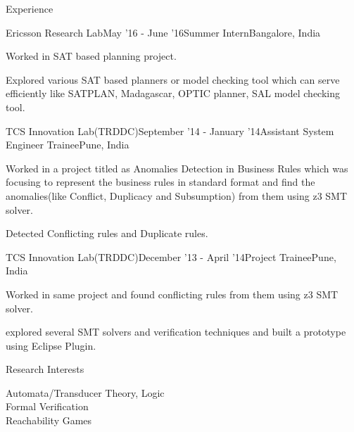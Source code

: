 \documentclass{resume} %
\begin{document}
\begin{rSection}{Experience}

\begin{rSubsection}{Ericsson Research Lab}{May '16 - June '16}{Summer Intern}{Bangalore, India}
\item Worked in SAT based planning project.
\item Explored various SAT based planners or model checking tool which can serve efficiently like SATPLAN, Madagascar, OPTIC planner, SAL model checking tool.
\end{rSubsection}

\begin{rSubsection}{TCS Innovation Lab(TRDDC)}{September '14 - January '14}{Assistant System Engineer Trainee}{Pune, India}
\item Worked in a project titled as Anomalies Detection in Business Rules which was focusing to represent the business rules in standard format and find the anomalies(like Conflict, Duplicacy and Subsumption) from them using z3 SMT solver.
\item Detected Conflicting rules and Duplicate rules.
\end{rSubsection}

\begin{rSubsection}{TCS Innovation Lab(TRDDC)}{December '13 - April '14}{Project Trainee}{Pune, India}
\item Worked in same project and found conflicting rules from them using z3 SMT solver.
\item explored several SMT solvers and verification techniques and built a prototype using Eclipse Plugin.
\end{rSubsection}


\end{rSection}





\begin{rSection}{Research Interests}

Automata/Transducer Theory, Logic \\
Formal Verification \\
Reachability Games \\

\end{rSection}
\end{document}
